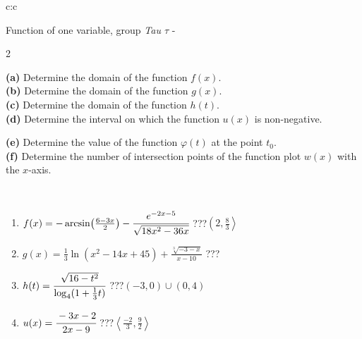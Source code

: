 \documentclass[10pt]{report}
\begin{document}
\begin{tabular}{c:c}
\begin{minipage}[c][104.5mm][t]{0.5\linewidth}
\begin{center}
\vspace{7mm}
{\huge Function of one variable, group \textit{Tau $\tau$} -}\\[5mm]
\begin{minipage}{0.95\linewidth}
\begin{center}
{\small \begin{multicols}{2} \raggedright
\textbf{(a)} Determine the domain of the function \(f(x)\). \\[1mm]
\textbf{(b)} Determine the domain of the function \(g(x)\). \\[1mm]
\textbf{(c)} Determine the domain of the function \(h(t)\). \\[1mm]
\textbf{(d)} Determine the interval on which the function \(u(x)\) is non-negative. \par \columnbreak
\textbf{(e)} Determine the value of the function \(\varphi(t)\) at the point \(t_0\). \\[1mm]
\textbf{(f)} Determine the number of intersection points of the function plot \(w(x)\) with the \(x\)-axis. \\[1mm]
\end{multicols}
}
\end{center}
\end{minipage}
\\[4mm]
\begin{minipage}{0.79\linewidth}
\begin{center}
\begin{varwidth}{\linewidth}
\begin{enumerate}
\small
\item $f(x) = -\arcsin\!\left( \frac{6-3x}{2} \right) - \cfrac{e^{-2x-5}}{\sqrt{18x^2-36x}}$\quad \dotfill\; ???\;\dotfill \quad $\left(2 , \frac{8}{3}\right\rangle$
\item $g(x) = \frac{1}{3} \ln{\!(x^2-14x+45)}+\frac{\sqrt[3]{-3-x}}{x-10}$\quad \dotfill\; ???\;\dotfill {}
\item $h(t) = \cfrac{\sqrt{16-t^2}}{\log_4(1+\frac{1}{3}t)}$\quad \dotfill\; ???\;\dotfill \quad $\left(-3 , 0\right)\cup\left(0 , 4\right)$
\item $u(x) = \cfrac{-3x-2}{2x-9}$\quad \dotfill\; ???\;\dotfill \quad $\left\langle\frac{-2}{3} , \frac{9}{2}\right\rangle$

\end{enumerate}
\end{varwidth}
\end{center}
\end{minipage}
\end{center}
\end{minipage}
\end{tabular}
\end{document}
